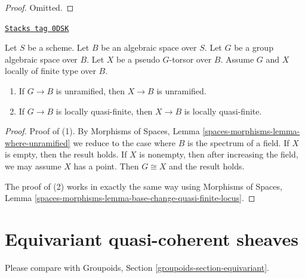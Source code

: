 \begin{proof}
Omitted.
\end{proof}

\begin{lemma}
\label{spaces-groupoids-lemma-pseudo-torsor-implications}
\href{https://stacks.math.columbia.edu/tag/0DSK}{\texttt{Stacks tag 0DSK}}

Let $S$ be a scheme. Let $B$ be an algebraic space over $S$.
Let $G$ be a group algebraic space over $B$.
Let $X$ be a pseudo $G$-torsor over $B$.
Assume $G$ and $X$ locally of finite type over $B$.
\begin{enumerate}
\item If $G \to B$ is unramified, then $X \to B$ is unramified.
\item If $G \to B$ is locally quasi-finite, then $X \to B$ is
locally quasi-finite.
\end{enumerate}
\end{lemma}

\begin{proof}
Proof of (1). By Morphisms of Spaces, Lemma
\ref{spaces-morphisms-lemma-where-unramified}
we reduce to the case where $B$ is the spectrum of a field.
If $X$ is empty, then the result holds. If $X$ is nonempty,
then after increasing the field, we may assume $X$ has a point.
Then $G \cong X$ and the result holds.

\medskip\noindent
The proof of (2) works in exactly the same way using
Morphisms of Spaces, Lemma
\ref{spaces-morphisms-lemma-base-change-quasi-finite-locus}.
\end{proof}

\section{Equivariant quasi-coherent sheaves}
\label{spaces-groupoids-section-equivariant}
Please compare with
Groupoids, Section \ref{groupoids-section-equivariant}.

